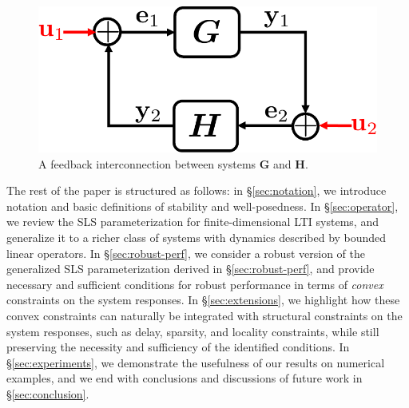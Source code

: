\begin{figure}
\centering
\includegraphics[width=.4\columnwidth]{well-posed}
\caption{A feedback interconnection between systems $\mathbf{G}$ and $\mathbf{H}$.}
\label{fig:well-posed}
\end{figure}

The rest of the paper is structured as follows: in \S \ref{sec:notation}, we introduce notation and basic definitions of stability and well-posedness.  In \S \ref{sec:operator}, we review the SLS parameterization for finite-dimensional LTI systems, and generalize it to a richer class of systems with dynamics described by bounded linear operators.  In \S \ref{sec:robust-perf}, we consider a robust version of the generalized SLS parameterization derived in \S \ref{sec:robust-perf}, and provide necessary and sufficient conditions for robust performance in terms of \emph{convex} constraints on the system responses.  In \S \ref{sec:extensions}, we highlight how these convex constraints can naturally be integrated with structural constraints on the system responses, such as delay, sparsity, and locality constraints, while still preserving the necessity and sufficiency of the identified conditions.  In \S \ref{sec:experiments}, we demonstrate the usefulness of our results on numerical examples, and we end  with conclusions and discussions of future work in \S \ref{sec:conclusion}.